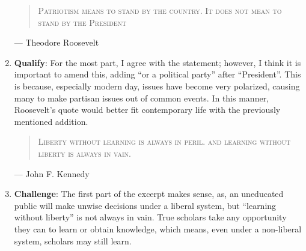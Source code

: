 \documentclass[12pt]{article}
\begin{document}
\begin{enumerate}
        \vspace{10pt}
        \hline
        \newpage
        \hline

        \begin{quote}
          \textsc{Patriotism means to stand by the country. It does not mean to stand by the President} 
        \end{quote} \vspace{-10pt}\hspace{325pt}— Theodore Roosevelt

      \item \textbf{Qualify}: For the most part, I agree with the statement; however, I think it is important to amend this, adding “or a political party” after “President”. This is because, especially modern day, issues have become very polarized, causing many to make partisan issues out of common events. In this manner, Roosevelt's quote would better fit contemporary life with the previously mentioned addition.

        \vspace{10pt}
        \hline

        \begin{quote}
          \textsc{Liberty without learning is always in peril. and learning without liberty is always in vain.} 
        \end{quote} \vspace{-10pt}\hspace{325pt}— John F. Kennedy

      \item \textbf{Challenge}: The first part of the excerpt makes sense, as, an uneducated public will make unwise decisions under a liberal system, but “learning without liberty” is not always in vain. True scholars take any opportunity they can to learn or obtain knowledge, which means, even under a non-liberal system, scholars may still learn.

        \vspace{10pt}
        \hline

    \end{enumerate}
\end{document}
